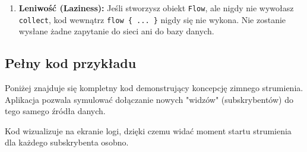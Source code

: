 \begin{enumerate}\addtocounter{enumi}{3}
    \item \textbf{Leniwość (Laziness):} Jeśli stworzysz obiekt \texttt{Flow}, ale nigdy nie wywołasz \texttt{collect}, kod wewnątrz \texttt{flow \{ ... \}} nigdy się nie wykona. Nie zostanie wysłane żadne zapytanie do sieci ani do bazy danych.
\end{enumerate}

\subsection{Pełny kod przykładu}

Poniżej znajduje się kompletny kod demonstrujący koncepcję zimnego strumienia. Aplikacja pozwala symulować dołączanie nowych "widzów" (subskrybentów) do tego samego źródła danych.

Kod wizualizuje na ekranie logi, dzięki czemu widać moment startu strumienia dla każdego subskrybenta osobno.

